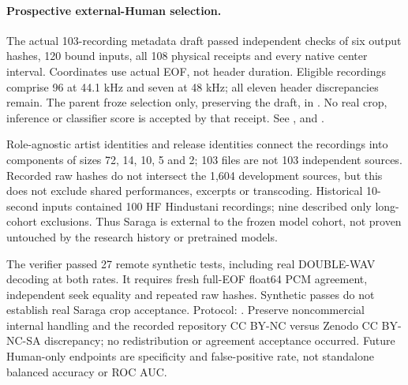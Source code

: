 \paragraph{Prospective external-Human selection.}
The actual 103-recording metadata draft passed independent checks of six output
hashes, 120 bound inputs, all 108 physical receipts and every native center
interval. Coordinates use actual EOF, not header duration. Eligible recordings
comprise 96 at 44.1 kHz and seven at 48 kHz; all eleven header discrepancies
remain. The parent froze selection only, preserving the draft, in
.
No real crop, inference or classifier score is accepted by that receipt.
See ,
 and
.

Role-agnostic artist identities and release identities connect the recordings
into components of sizes 72, 14, 10, 5 and 2; 103 files are not 103 independent
sources. Recorded raw hashes do not intersect the 1,604 development sources,
but this does not exclude shared performances, excerpts or transcoding.
Historical 10-second inputs contained 100 HF Hindustani recordings; nine
described only long-cohort exclusions. Thus Saraga is external to the frozen
model cohort, not proven untouched by the research history or pretrained models.

The verifier  passed 27 remote synthetic
tests, including real DOUBLE-WAV decoding at both rates. It requires fresh
full-EOF float64 PCM agreement, independent seek equality and repeated raw
hashes. Synthetic passes do not establish real Saraga crop acceptance.
Protocol: . Preserve noncommercial internal
handling and the recorded repository CC BY-NC versus Zenodo CC BY-NC-SA
discrepancy; no redistribution or agreement acceptance occurred. Future
Human-only endpoints are specificity and false-positive rate, not standalone
balanced accuracy or ROC AUC.

